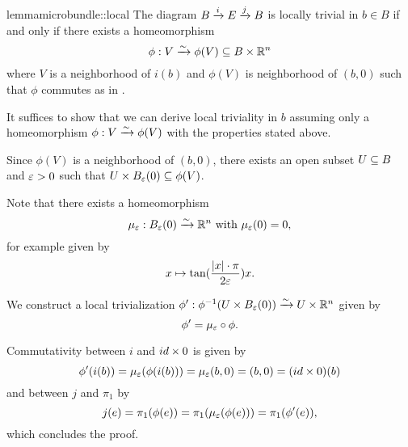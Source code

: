 \begin{myparagraph}
        
\end{myparagraph}

\begin{mystatement}{lemma}{microbundle::local}
    The diagram $\bundle{B}{E}{i}{j}$ is locally trivial in $b \in B$
    if and only if there exists a homeomorphism
    \[ \phi: V \isomto \phi(V) \sub B \times \R^n \]
    where $V$ is a neighborhood of $i(b)$ and $\phi(V)$
    is neighborhood of $(b, 0)$ such that $\phi$ commutes
    as in .
\end{mystatement}

\begin{myproof}
    It suffices to show that we can derive local triviality in $b$
    assuming only a homeomorphism $\phi: V \isomto \phi(V)$ with the properties stated above.

    Since $\phi(V)$ is a neighborhood of $(b, 0)$,
    there exists an open subset $U \sub B$ and $\eps > 0$ such
    that $U \times \ball[\eps] \sub \phi(V)$.

    Note that there exists a homeomorphism
    \[ \mu_\eps: \ball[\eps] \isomto \R^n \twith \mu_\eps(0) = 0, \]
    for example given by
    \[ x \mapsto \tan(\frac{\abs{x}\cdot\pi}{2\eps}) x. \]

    We construct a local trivialization
    $\phi': \inv{\phi}(U \times \ball[\eps]) \isomto U \times \R^n$
    given by
    \[ \phi' = \mu_\eps \circ \phi. \]

    Commutativity between $i$ and $id \cross 0$ is given by
    \[ \phi'(i(b)) = \mu_\eps(\phi(i(b))) = \mu_\eps(b, 0) = (b, 0) = (id \cross 0)(b) \]
    and between $j$ and $\pi_1$ by
    \[ j(e) = \pi_1(\phi(e)) = \pi_1(\mu_\eps(\phi(e))) = \pi_1(\phi'(e)), \]
    which concludes the proof.
\end{myproof}